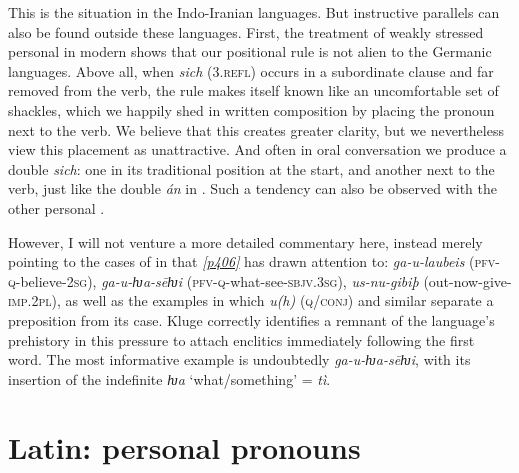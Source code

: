 This is the situation in the Indo-Iranian languages. But instructive parallels can also be found outside these languages. First, the treatment of weakly stressed personal  in modern  shows that our positional rule is not alien to the Germanic languages. Above all, when \emph{sich} (\textsc{3.refl}) occurs in a subordinate clause and far removed from the verb, the rule makes itself known like an uncomfortable set of shackles, which we happily shed in written composition by placing the pronoun next to the verb. We believe that this creates greater clarity, but we nevertheless view this placement as unattractive. And often in oral conversation we produce a double \emph{sich}: one in its traditional position at the start, and another next to the verb, just like the double \emph{án} in . Such a tendency can also be observed with the other personal .

However, I will not venture a more detailed commentary here, instead merely pointing to the cases of  in  that \citet[80]{Kluge1883} \hyperlink{p406}{\emph{[p406]}} has drawn attention to: \emph{ga-\emph{u}-laubeis} (\textsc{pfv}-\textsc{q}-believe-\textsc{2sg}), \emph{ga-\emph{u}-ƕa-sēƕi} (\textsc{pfv}-\textsc{q}-what-see-\textsc{sbjv.3sg}), \emph{us-\emph{nu}-gibiþ} (out-now-give-\textsc{imp.2pl}), as well as the examples in which \emph{u(h)} (\textsc{q}/\textsc{conj}) and similar   separate a preposition from its case. Kluge correctly identifies a remnant of the language's prehistory in this pressure to attach enclitics immediately following the first word. The most informative example is undoubtedly \emph{ga-u-ƕa-sēƕi}, with its insertion of the indefinite \emph{ƕa} `what/something' =  \textit{tì}.


\section{Latin: personal pronouns}

